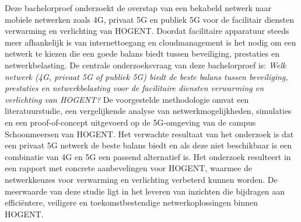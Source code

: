 Deze bachelorproef onderzoekt de overstap van een bekabeld netwerk naar mobiele netwerken zoals 4G, privaat 5G en publiek 5G voor de facilitair diensten verwarming en verlichting van HOGENT. Doordat facilitaire apparatuur steeds meer afhankelijk is van internettoegang en cloudmanagement is het nodig om een netwerk te kiezen die een goede balans biedt tussen beveiliging, prestaties en netwerkbelasting. De centrale onderzoeksvraag van deze bachelorproef is: \textit{Welk netwerk (4G, privaat 5G of publiek 5G) biedt de beste balans tussen beveiliging, prestaties en netwerkbelasting voor de facilitaire diensten verwarming en verlichting van HOGENT?} De voorgestelde methodologie omvat een literatuurstudie, een vergelijkende analyse van netwerkmogelijkheden, simulaties en een proof-of-concept uitgevoerd op de 5G-omgeving van de campus Schoonmeersen van HOGENT. Het verwachte resultaat van het onderzoek is dat een privaat 5G netwerk de beste balans biedt en als deze niet beschikbaar is een combinatie van 4G en 5G een passend alternatief is. Het onderzoek resulteert in een rapport met concrete aanbevelingen voor HOGENT, waarmee de netwerkkeuzes voor verwarming en verlichting verbeterd kunnen worden. De meerwaarde van deze studie ligt in het leveren van inzichten die bijdragen aan efficiëntere, veiligere en toekomstbestendige netwerkoplossingen binnen HOGENT.
